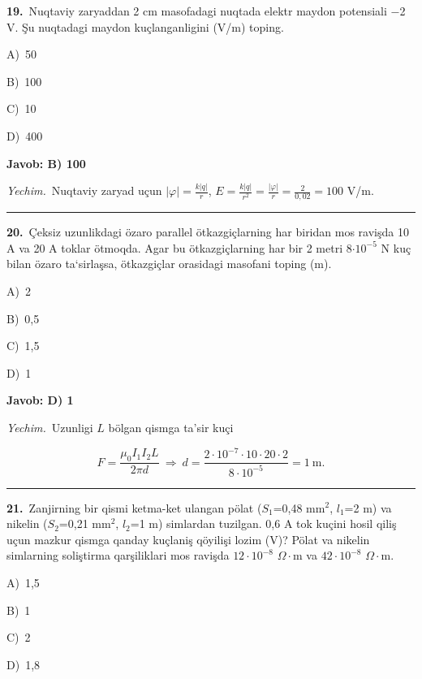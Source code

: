 \documentclass[11pt,a4paper]{article}
\newcommand{\opt}[2]{\hspace*{4mm}#1)\ #2\par}
\begin{document}
\noindent\begin{minipage}{\linewidth}
\textbf{19.}\ Nuqtaviy zaryaddan 2 cm masofadagi nuqtada elektr maydon potensiali $-$2 V. Şu nuqtadagi maydon kuçlanganligini (V/m) toping.\par\smallskip
\opt{A}{50}
\opt{B}{100}
\opt{C}{10}
\opt{D}{400}
\end{minipage}\vspace{2pt}\par
\noindent\colorbox{gray!12}{\parbox{\dimexpr\linewidth-2\fboxsep}{\textbf{Javob: B) 100}}}\par\smallskip
\noindent\textit{Yechim.}\ Nuqtaviy zaryad uçun $|\varphi|=\frac{k|q|}{r}$, $E=\frac{k|q|}{r^2}=\frac{|\varphi|}{r}=\frac{2}{0{,}02}=100$ V/m.\par\par\medskip\hrule\medskip
{}\noindent\begin{minipage}{\linewidth}
\textbf{20.}\ Çeksiz uzunlikdagi özaro parallel ötkazgiçlarning har biridan mos ravişda 10 A va 20 A toklar ötmoqda. Agar bu ötkazgiçlarning har bir 2 metri 8$\cdot10^{-5}$ N kuç bilan özaro ta‘sirlaşsa, ötkazgiçlar orasidagi masofani toping (m).\par\smallskip
\opt{A}{2}
\opt{B}{0,5}
\opt{C}{1,5}
\opt{D}{1}
\end{minipage}\vspace{2pt}\par
\noindent\colorbox{gray!12}{\parbox{\dimexpr\linewidth-2\fboxsep}{\textbf{Javob: D) 1}}}\par\smallskip
\noindent\textit{Yechim.}\ Uzunligi $L$ bölgan qismga ta’sir kuçi\par
\[F=\frac{\mu_0I_1I_2L}{2\pi d}\ \Rightarrow\ d=\frac{2\cdot10^{-7}\cdot10\cdot20\cdot2}{8\cdot10^{-5}}=1\ \text{m}.\]\par\medskip\hrule\medskip
{}\noindent\begin{minipage}{\linewidth}
\textbf{21.}\ Zanjirning bir qismi ketma-ket ulangan pölat ($S_1$=0,48 mm$^{2}$, $l_1$=2 m) va nikelin ($S_2$=0,21 mm$^{2}$, $l_2$=1 m) simlardan tuzilgan. 0,6 A tok kuçini hosil qiliş uçun mazkur qismga qanday kuçlaniş qöyilişi lozim (V)? Pölat va nikelin simlarning soliştirma qarşiliklari mos ravişda $12\cdot10^{-8}$ $\Omega\cdot$m va $42\cdot10^{-8}$ $\Omega\cdot$m.\par\smallskip
\opt{A}{1,5}
\opt{B}{1}
\opt{C}{2}
\opt{D}{1,8}
\end{minipage}\vspace{2pt}\par
\end{document}
